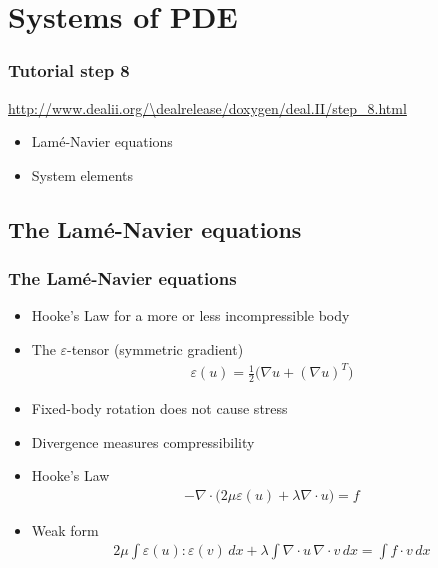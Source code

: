 
\section[Systems]{Systems of PDE}

\begin{frame}
  \frametitle{Tutorial step 8}
  {\footnotesize{\url{http://www.dealii.org/\dealrelease/doxygen/deal.II/step_8.html}}}
  \begin{itemize}
  \item Lam\'e-Navier equations
  \item System elements
  \end{itemize}
\end{frame}

\subsection{The Lam\'e-Navier equations}
\begin{frame}
  \frametitle{The Lam\'e-Navier equations}
  \begin{itemize}
  \item Hooke's Law for a more or less incompressible body
  \item The $\varepsilon$-tensor (symmetric gradient)
    \begin{gather*}
      \varepsilon(u) = \tfrac12
      \bigl( \nabla u + (\nabla u)^T \bigr)
    \end{gather*}
  \item Fixed-body rotation does not cause stress
  \item Divergence measures compressibility
  \item Hooke's Law
  \begin{gather*}
    -\nabla\cdot \bigl(2\mu\varepsilon(u) + \lambda \nabla\cdot
    u\bigr) = f
  \end{gather*}
  \item Weak form
    \begin{gather*}
      2\mu \int \varepsilon(u) : \varepsilon(v)\,dx
      + \lambda \int \nabla\cdot u \,\nabla\cdot v\,dx
      = \int f\cdot v\,dx
    \end{gather*}
  \end{itemize}
\end{frame}

